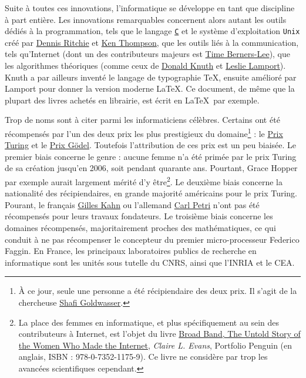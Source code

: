 \documentclass[10pt]{article}
\begin{document}
Suite à toutes ces innovations, l'informatique se développe en tant que discipline à part entière. Les innovations remarquables concernent
alors autant les outils dédiés à la programmation, tels que le langage
\href{https://en.wikipedia.org/wiki/C_(programming_language)}{\texttt{C}} et le système d'exploitation \texttt{Unix}
créé par \href{https://en.wikipedia.org/wiki/Dennis_Ritchie}{Dennis Ritchie}
et \href{https://en.wikipedia.org/wiki/Ken_Thompson}{Ken Thompson}, que les outils liés à la communication, tels qu'Internet
(dont un des contributeurs majeurs est \href{https://fr.wikipedia.org/wiki/Tim_Berners-Lee}{Time Berners-Lee}), 
que les algorithmes théoriques (comme ceux de \href{https://fr.wikipedia.org/wiki/Donald_Knuth}{Donald Knuth} et \href{https://fr.wikipedia.org/wiki/Leslie_Lamport}{Leslie Lamport}).
Knuth a par ailleurs inventé le langage de typographie \TeX, ensuite amélioré par Lamport pour donner la version moderne \LaTeX.
Ce document, de même que la plupart des livres achetés en librairie, est écrit en \LaTeX~par exemple.

Trop de noms sont à citer parmi les informaticiens célèbres. Certains ont été récompensés par l'un des deux prix les plus prestigieux du domaine\footnote{
  À ce jour, seule une personne a été récipiendaire des deux prix. Il s'agit de la chercheuse \href{https://fr.wikipedia.org/wiki/Shafi_Goldwasser}{Shafi Goldwasser}.
} :
le \href{https://fr.wikipedia.org/wiki/Prix_Turing}{Prix Turing} et le \href{https://fr.wikipedia.org/wiki/Prix_G\%C3\%B6del}{Prix Gödel}.
Toutefois l'attribution de ces prix est un peu biaisée. Le premier biais concerne le genre : aucune femme n'a été primée par le prix Turing de
sa création jusqu'en 2006, soit pendant quarante ans. Pourtant, Grace Hopper par exemple aurait largement mérité d'y être\footnote{
  La place des femmes en informatique, et plus spécifiquement au sein des contributeurs à Internet, est l'objet du livre
  \underline{Broad Band, The Untold Story of the Women Who Made the Internet}, \textit{Claire L. Evans}, Portfolio Penguin
  (en anglais, ISBN : 978-0-7352-1175-9). Ce livre ne considère par trop les avancées scientifiques cependant.
}. Le deuxième biais
concerne la nationalité des récipiendaires, en grande majorité américains pour le prix Turing. Pourant, le français \href{https://fr.wikipedia.org/wiki/Gilles_Kahn}{Gilles Kahn}
ou l'allemand \href{https://fr.wikipedia.org/wiki/Carl_Adam_Petri}{Carl Petri} n'ont pas été récompensés pour leurs travaux fondateurs.
Le troisième biais concerne les domaines récompensés, majoritairement proches des mathématiques, ce qui conduit à ne pas récompenser le concepteur du premier
micro-processeur Federico Faggin. En France, les principaux laboratoires publics de recherche en informatique sont les unités sous tutelle du CNRS,
ainsi que l'INRIA et le CEA.
\end{document}
